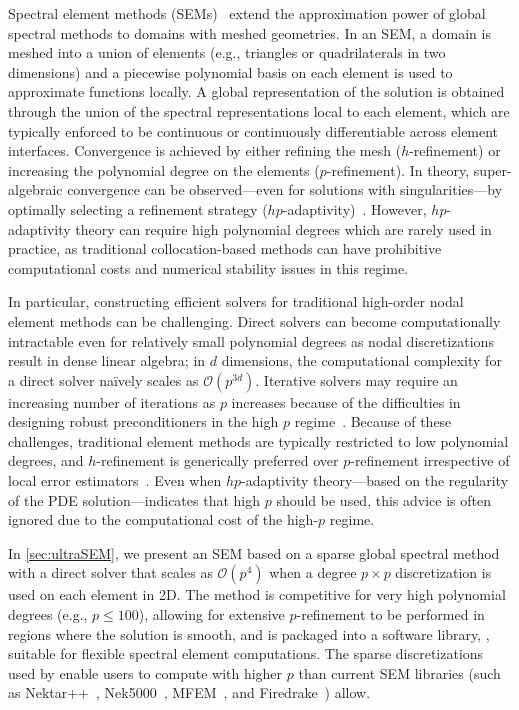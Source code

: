 Spectral element methods (SEMs)~\cite{Patera_84_01} extend the approximation power of global spectral methods to domains with meshed geometries. In an SEM, a domain is meshed into a union of elements (e.g., triangles or quadrilaterals in two dimensions) and a piecewise polynomial basis on each element is used to approximate functions locally. A global representation of the solution is obtained through the union of the spectral representations local to each element, which are typically enforced to be continuous or continuously differentiable across element interfaces. Convergence is achieved by either refining the mesh ($h$-refinement) or increasing the polynomial degree on the elements ($p$-refinement). In theory, super-algebraic convergence can be observed---even for solutions with singularities---by optimally selecting a refinement strategy ($hp$-adaptivity)~\cite{Babuska_86_01}. However, $hp$-adaptivity theory can require high polynomial degrees which are rarely used in practice, as traditional collocation-based methods can have prohibitive computational costs and numerical stability issues in this regime.

In particular, constructing efficient solvers for traditional high-order nodal element methods can be challenging. Direct solvers can become computationally intractable even for relatively small polynomial degrees as nodal discretizations result in dense linear algebra; in $d$ dimensions, the computational complexity for a direct solver na\"{i}vely scales as $\mathcal{O}(p^{3d})$. Iterative solvers may require an increasing number of iterations as $p$ increases because of the difficulties in designing robust preconditioners in the high $p$ regime~\cite{Orszag_80_01}. Because of these challenges, traditional element methods are typically restricted to low polynomial degrees, and $h$-refinement is generically preferred over $p$-refinement irrespective of local error estimators~\cite{Vos_10_01}. %
Even when $hp$-adaptivity theory---based on the regularity of the PDE solution---indicates that high $p$ should be used, this advice is often ignored due to the computational cost of the high-$p$ regime.

In \cref{sec:ultraSEM}, we present an SEM based on a sparse global spectral method with a direct solver that scales as $\mathcal{O}(p^4)$ when a degree $p \times p$ discretization is used on each element in 2D. The method is competitive for very high polynomial degrees (e.g., $p \leq 100$), allowing for extensive $p$-refinement to be performed in regions where the solution is smooth, and is packaged into a software library, \ultraSEM, suitable for flexible spectral element computations. The sparse discretizations used by \ultraSEM enable users to compute with higher $p$ than current SEM libraries (such as Nektar++~\cite{Nektar,Nektar2}, Nek5000~\cite{Nek5000}, MFEM~\cite{MFEM}, and Firedrake~\cite{Firedrake}) allow.

